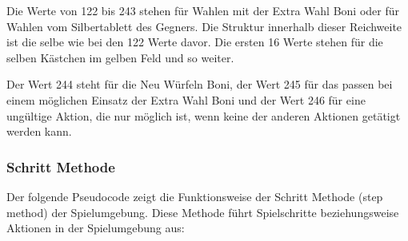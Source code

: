 Die Werte von 122 bis 243 stehen für Wahlen mit der Extra Wahl Boni oder für Wahlen vom Silbertablett des Gegners. Die Struktur innerhalb dieser Reichweite ist die selbe wie bei den 122 Werte davor. Die ersten 16 Werte stehen für die selben Kästchen im gelben Feld und so weiter.

Der Wert 244 steht für die Neu Würfeln Boni, der Wert 245 für das passen bei einem möglichen Einsatz der Extra Wahl Boni und der Wert 246 für eine ungültige Aktion, die nur möglich ist, wenn keine der anderen Aktionen getätigt werden kann.
\subsubsection{Schritt Methode}
Der folgende Pseudocode zeigt die Funktionsweise der Schritt Methode (step method) der Spielumgebung. Diese Methode führt Spielschritte beziehungsweise Aktionen in der Spielumgebung aus:
\vspace{0.5cm}
